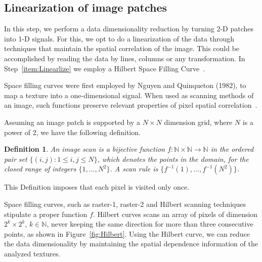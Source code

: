 \documentclass{isprs}
\begin{document}
	\subsection{Linearization of image patches}\label{linearization}
	
	In this step, we perform a data dimensionality reduction by turning 2-D patches into 1-D signals.
	For this, we opt to do a linearization of the data through techniques that maintain the spatial correlation of the image.
	This could be accomplished by reading the data by lines, columns or any transformation.
	In Step~\ref{item:Linearlize} we employ a Hilbert Space Filling Curve~\cite{Lee1994Texture}.
	
	Space filling curves were first employed by Nguyen and Quinqueton (1982), to map a texture into a one-dimensional signal.
	When used as scanning methods of an image, such functions preserve relevant properties of pixel spatial correlation~\cite{Lee1994Texture}.
	
	Assuming an image patch is supported by a $N \times N$ dimension grid, where $N$ is a power of $2$, we have the following definition.
	
	\newtheorem{mydef}{Definition}
	\begin{mydef}
		An image scan is a bijective function $f \colon \mathbb{N} \times \mathbb{N} \to \mathbb{N}$ in the ordered pair set $ \{(i, j): 1 \leq i , j \leq N \}$, which denotes the points in the domain, for the closed range of integers $\{1, \dots, N^2\}$.
		A scan rule is $\{f^{-1}(1), \dots, f^{-1}(N^2)\}$.
		\label{def:CurveFilling}
	\end{mydef}
	This Definition imposes that each pixel is visited only once.
	
	Space filling curves, such as raster-1, raster-2 and Hilbert scanning techniques stipulate a proper function $f$.
	Hilbert curves scans an array of pixels of dimension $2^k \times 2^k$, $k \in \mathbb{N}$, never keeping the same direction for more than three consecutive points, as shown in Figure~\ref{fig:Hilbert}.
	Using the Hilbert curve, we can reduce the data dimensionality by maintaining the spatial dependence information of the analyzed textures.
	
\end{document}

